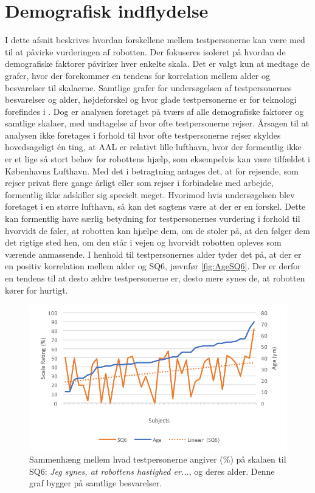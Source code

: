\section{Demografisk indflydelse}
\label{sec:Demografi}
%
I dette afsnit beskrives hvordan forskellene mellem testpersonerne kan være med til at påvirke vurderingen af robotten. Der fokuseres isoleret på hvordan de demografiske faktorer påvirker hver enkelte skala. Det er valgt kun at medtage de grafer, hvor der forekommer en tendens for korrelation mellem alder og besvarelser til skalaerne. Samtlige grafer for undersøgelsen af testpersonernes besvarelser og alder, højdeforskel og hvor glade testpersonerne er for teknologi forefindes i . Dog er analysen foretaget på tværs af alle demografiske faktorer og samtlige skalaer, med undtagelse af hvor ofte testpersonerne rejser. Årsagen til at analysen ikke foretages i forhold til hvor ofte testpersonerne rejser skyldes hovedsageligt én ting, at AAL er relativt lille lufthavn, hvor der formentlig ikke er et lige så stort behov for robottens hjælp, som eksempelvis kan være tilfældet i Københavns Lufthavn. Med det i betragtning antages det, at for rejsende, som rejser privat flere gange årligt eller som rejser i forbindelse med arbejde, formentlig ikke adskiller sig specielt meget. Hvorimod hvis undersøgelsen blev foretaget i en større lufthavn, så kan det sagtens være at der er en forskel. Dette kan formentlig have særlig betydning for testpersonernes vurdering i forhold til hvorvidt de føler, at robotten kan hjælpe dem, om de stoler på, at den følger dem det rigtige sted hen, om den står i vejen og hvorvidt robotten opleves som værende anmassende.\blankline
% 
I henhold til testpersonernes alder tyder det på, at der er en positiv korrelation mellem alder og SQ6, jævnfør \autoref{fig:AgeSQ6}. Der er derfor en tendens til at desto ældre testpersonerne er, desto mere synes de, at robotten kører for hurtigt. 
%
\begin{figure}[H]
\centering
\includegraphics[width=\textwidth]{Figure/DatabehandlingSkalaer/Demografi/AgeSQ6}
\caption{Sammenhæng mellem hvad testpersonerne angiver (\%) på skalaen til SQ6: \textit{Jeg synes, at robottens hastighed er...}, og deres alder. Denne graf bygger på samtlige besvarelser.}
\label{fig:AgeSQ6}
\end{figure}
